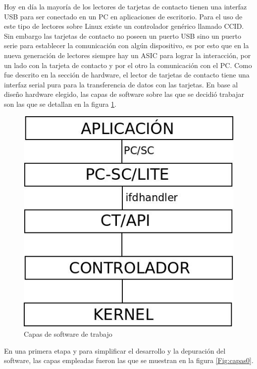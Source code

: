\bigskip
{}

Hoy en día la mayoría de los lectores de tarjetas de contacto tienen una interfaz USB para ser conectado en un PC en aplicaciones de escritorio. Para el uso de este tipo de lectores sobre Linux existe un controlador genérico llamado CCID.
Sin embargo las tarjetas de contacto no poseen un puerto USB sino un puerto serie para establecer la comunicación con algún dispositivo, es por esto que en la nueva generación de lectores siempre hay un  ASIC para lograr la interacción, por un lado con la tarjeta de contacto y por el otro la comunicación con el PC.
Como fue descrito en la sección de hardware, el lector de tarjetas de contacto tiene una interfaz serial pura para la transferencia de datos con las tarjetas. En base al diseño hardware elegido, las capas de software sobre las que se decidió trabajar son las que se detallan en la figura \ref{Fig:capas}. 

\begin{figure}[H]
\centering
  \begin{center}
  \includegraphics[scale=.4]{Imagenes/SW_sc1.jpg} 
  \end{center}
  \caption{Capas de software de trabajo}\label{Fig:capas} 
\end{figure}

En una primera etapa y para simplificar el desarrollo y la depuración del software, las capas empleadas fueron las que se muestran en la figura \ref{Fig:capas0}.


